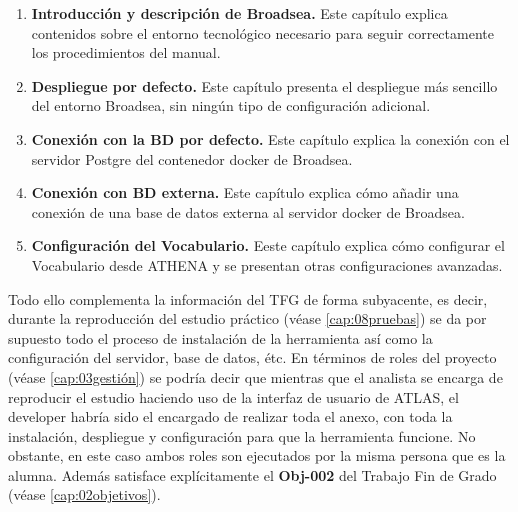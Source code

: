 \begin{enumerate}
    \item \textbf{Introducción y descripción de Broadsea.} Este capítulo explica contenidos sobre el entorno tecnológico necesario para seguir correctamente los procedimientos del manual.
    \item \textbf{Despliegue por defecto.} Este capítulo presenta el despliegue más sencillo del entorno Broadsea, sin ningún tipo de configuración adicional.
    \item \textbf{Conexión con la BD por defecto.} Este capítulo explica la conexión con el servidor Postgre del contenedor docker de Broadsea.
    \item \textbf{Conexión con BD externa.} Este capítulo explica cómo añadir una conexión de una base de datos externa al servidor docker de Broadsea.
    \item \textbf{Configuración del Vocabulario.} Eeste capítulo explica cómo configurar el Vocabulario desde ATHENA y se presentan otras configuraciones avanzadas.
\end{enumerate}

Todo ello complementa la información del TFG de forma subyacente, es decir, durante la reproducción del estudio práctico (véase \ref{cap:08pruebas}) se da por supuesto todo el proceso de instalación de la herramienta así como la configuración del servidor, base de datos, étc. En términos de roles del proyecto (véase \ref{cap:03gestión}) se podría decir que mientras que el analista se encarga de reproducir el estudio haciendo uso de la interfaz de usuario de ATLAS, el developer habría sido el encargado de realizar toda el anexo, con toda la instalación, despliegue y configuración para que la herramienta funcione. No obstante, en este caso ambos roles son ejecutados por la misma persona que es la alumna. Además satisface explícitamente el \textbf{Obj-002} del Trabajo Fin de Grado (véase \ref{cap:02objetivos}).



